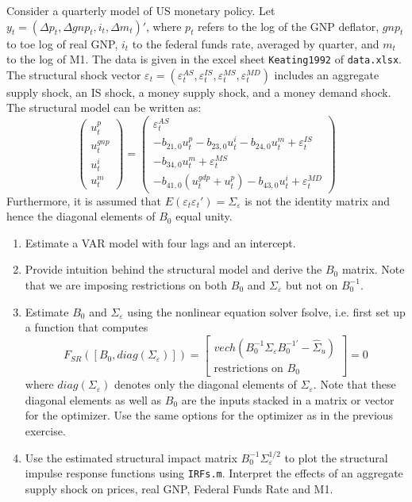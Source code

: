 Consider a quarterly model of US monetary policy. Let $y_t=(\Delta p_t, \Delta gnp_t, i_t, \Delta m_t)'$, where $p_t$ refers to the log of the GNP deflator, $gnp_t$ to toe log of real GNP, $i_t$ to the federal funds rate, averaged by quarter, and $m_t$ to the log of M1.
The data is given in the excel sheet \texttt{Keating1992} of \texttt{data.xlsx}. The structural shock vector $\varepsilon_t = (\varepsilon_t^{AS},\varepsilon_t^{IS},\varepsilon_t^{MS},\varepsilon_t^{MD})$ includes an aggregate supply shock, an IS shock, a money supply shock, and a money demand shock. The structural model can be written as:
$$\begin{pmatrix}
        u_t^p \\u_t^{gnp}\\u_t^{i}\\u_t^m
    \end{pmatrix} =
    \begin{pmatrix}
        \varepsilon_{t}^{AS}                                                 \\
        -b_{21,0}u_t^p - b_{23,0} u_t^i- b_{24,0}u_t^m +\varepsilon_{t}^{IS} \\
        -b_{34,0}u_t^m + \varepsilon_{t}^{MS}                                \\
        -b_{41,0}(u_t^{gdp}+u_t^p)-b_{43,0}u_t^i +\varepsilon_{t}^{MD}
    \end{pmatrix}$$
Furthermore, it is assumed that $E(\varepsilon_t \varepsilon_t')=\Sigma_\varepsilon$ is not the identity matrix and hence the diagonal elements of $B_0$ equal unity.
\begin{enumerate}
    \item Estimate a VAR model with four lags and an intercept.
    \item Provide intuition behind the structural model and derive the $B_0$ matrix. Note that we are imposing restrictions on both $B_0$ and $\Sigma_\varepsilon$ but not on $B_0^{-1}$.
    \item Estimate $B_0$ and $\Sigma_\varepsilon$ using the nonlinear equation solver fsolve, i.e. first set up a function that computes
          $$ F_{SR}([B_0, diag(\Sigma_\varepsilon)]) = \begin{bmatrix} vech\left(B_0^{-1} \Sigma_\varepsilon B_0^{-1'} - \hat{\Sigma}_u\right)\\\text{restrictions on }B_0\end{bmatrix}=0$$
          where $diag(\Sigma_\varepsilon)$ denotes only the diagonal elements of $\Sigma_\varepsilon$. Note that these diagonal elements as well as $B_0$ are the inputs stacked in a matrix or vector for the optimizer.
          Use the same options for the optimizer as in the previous exercise.
    \item Use the estimated structural impact matrix $B_0^{-1}\Sigma_\varepsilon^{1/2}$ to plot the structural impulse response functions using \texttt{IRFs.m}. Interpret the effects of an aggregate supply shock on prices, real GNP, Federal Funds Rate and M1.
\end{enumerate}
\newpage
